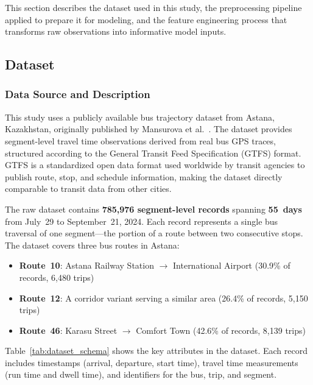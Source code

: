 This section describes the dataset used in this study, the preprocessing pipeline applied to prepare it for modeling, and the feature engineering process that transforms raw observations into informative model inputs.

\subsection{Dataset}
\label{subsec:dataset}

\subsubsection{Data Source and Description}
\label{subsubsec:data_source}

This study uses a publicly available bus trajectory dataset from Astana, Kazakhstan, originally published by Mansurova et al.~\cite{mansurova2025dataset}. The dataset provides segment-level travel time observations derived from real bus GPS traces, structured according to the General Transit Feed Specification (GTFS) format. GTFS is a standardized open data format used worldwide by transit agencies to publish route, stop, and schedule information, making the dataset directly comparable to transit data from other cities.

The raw dataset contains \textbf{785,976 segment-level records} spanning \textbf{55~days} from July~29 to September~21, 2024. Each record represents a single bus traversal of one segment—the portion of a route between two consecutive stops. The dataset covers three bus routes in Astana:

\begin{itemize}
    \item \textbf{Route~10}: Astana Railway Station $\rightarrow$ International Airport (30.9\% of records, 6,480 trips)
    \item \textbf{Route~12}: A corridor variant serving a similar area (26.4\% of records, 5,150 trips)
    \item \textbf{Route~46}: Karasu Street $\rightarrow$ Comfort Town (42.6\% of records, 8,139 trips)
\end{itemize}

Table~\ref{tab:dataset_schema} shows the key attributes in the dataset. Each record includes timestamps (arrival, departure, start time), travel time measurements (run time and dwell time), and identifiers for the bus, trip, and segment.


